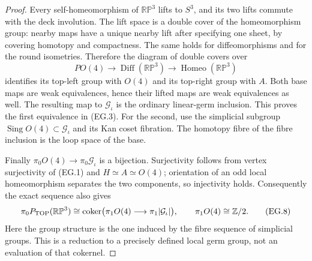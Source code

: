 \begin{proof}
Every self-homeomorphism of $\mathbb {RP}^3$ lifts to $S^3$, and its two
lifts commute with the deck involution. The lift space is a double cover
of the homeomorphism group: nearby maps have a unique nearby lift after
specifying one sheet, by covering homotopy and compactness. The same holds
for diffeomorphisms and for the round isometries. Therefore the diagram
of double covers over
\[
 PO(4)\longrightarrow\operatorname{Diff}(\mathbb {RP}^3)
         \longrightarrow\operatorname{Homeo}(\mathbb {RP}^3)
\]
identifies its top-left group with $O(4)$ and its top-right group with
$A$. Both base maps are weak equivalences, hence their lifted maps are
weak equivalences as well. The resulting map to $\mathcal G_\iota$ is
the ordinary linear-germ inclusion. This proves the first equivalence
in (EG.3). For the second, use the simplicial subgroup
$\operatorname{Sing}O(4)\subset\mathcal G_\iota$ and its Kan coset fibration.
The homotopy fibre of the fibre inclusion is the loop space of the base.

Finally $\pi_0O(4)\to\pi_0\mathcal G_\iota$ is a bijection. Surjectivity
follows from vertex surjectivity of (EG.1) and $H\simeq A\simeq O(4)$;
orientation of an odd local homeomorphism separates the two components,
so injectivity holds. Consequently the exact sequence also gives
\[
 \pi_0P_{\rm TOP}(\mathbb {RP}^3)
 \cong
 \operatorname{coker}\bigl(\pi_1O(4)\longrightarrow
                              \pi_1|\mathcal G_\iota|\bigr),
 \qquad \pi_1O(4)\cong\mathbb Z/2.
 \tag{EG.8}
\]
Here the group structure is the one induced by the fibre sequence of
simplicial groups. This is a reduction to a precisely defined local
germ group, not an evaluation of that cokernel.
\end{proof}
